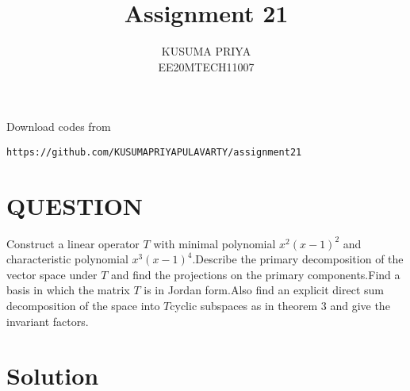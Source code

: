 \documentclass[journal,12pt,onecolumn]{IEEEtran}
\begin{document}
\renewcommand{\thefigure}{\theproblem}

\def\putbox#1#2#3{\makebox[0in][l]{\makebox[#1][l]{}\raisebox{\baselineskip}[0in][0in]{\raisebox{#2}[0in][0in]{#3}}}}
     \def\rightbox#1{\makebox[0in][r]{#1}}
     \def\centbox#1{\makebox[0in]{#1}}
     \def\topbox#1{\raisebox{-\baselineskip}[0in][0in]{#1}}
     \def\midbox#1{\raisebox{-0.5\baselineskip}[0in][0in]{#1}}
\vspace{3cm}
\title{Assignment 21}
\author{KUSUMA PRIYA\\EE20MTECH11007}

\maketitle

\bigskip
\renewcommand{\thefigure}{\theenumi}
\renewcommand{\thetable}{\theenumi}
Download codes from 
%
\begin{lstlisting}
https://github.com/KUSUMAPRIYAPULAVARTY/assignment21
\end{lstlisting}
%
 
\section{QUESTION}
Construct a linear operator $T$ with minimal polynomial $x^2(x-1)^2$ and characteristic polynomial $x^3(x-1)^4$.Describe the primary decomposition of the vector space under $T$ and find the projections on the primary components.Find a basis in which the matrix $T$ is in Jordan form.Also find an explicit direct sum decomposition of the space into $T$cyclic subspaces as in theorem 3 and give the invariant factors.

%

\section{Solution}
\end{document}

